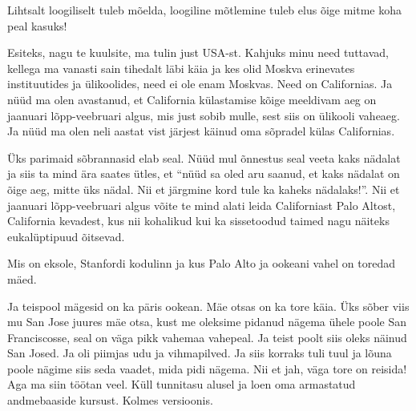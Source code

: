 
Lihtsalt loogiliselt tuleb mõelda, loogiline mõtlemine tuleb elus õige mitme koha peal kasuks! 


Esiteks, nagu te kuulsite, ma tulin just USA-st. Kahjuks minu need tuttavad, kellega ma vanasti sain tihedalt läbi  käia ja kes olid Moskva erinevates instituutides ja ülikoolides, need ei ole enam Moskvas. Need on Californias. Ja nüüd ma olen avastanud, et California külastamise kõige meeldivam aeg on jaanuari lõpp-veebruari algus, mis just sobib mulle, sest siis on ülikooli vaheaeg. Ja nüüd ma olen neli aastat vist järjest käinud oma sõpradel külas Californias. 

Üks parimaid sõbrannasid elab seal. Nüüd mul õnnestus seal veeta kaks nädalat ja siis ta mind ära saates ütles, et \enquote{nüüd sa oled aru saanud, et  kaks nädalat on õige aeg, mitte üks nädal. Nii et järgmine kord tule ka kaheks nädalaks!}. Nii et jaanuari lõpp-veebruari algus võite te mind alati leida Californiast Palo Altost, California kevadest, kus nii kohalikud kui ka sissetoodud taimed nagu näiteks eukalüptipuud õitsevad. 


Mis on eksole, Stanfordi kodulinn ja kus Palo Alto ja ookeani vahel on toredad mäed. 

Ja teispool mägesid on ka päris ookean. Mäe otsas on ka tore käia. Üks sõber viis mu San Jose juures mäe otsa, kust me oleksime pidanud nägema ühele poole San Franciscosse, seal on väga pikk vahemaa vahepeal. Ja teist poolt siis oleks näinud San Josed. Ja oli piimjas udu ja vihmapilved. Ja siis korraks tuli tuul ja lõuna poole nägime siis seda vaadet, mida pidi nägema. Nii et jah, väga tore on reisida! Aga ma siin töötan veel. Küll tunnitasu alusel ja loen oma armastatud andmebaaside kursust. Kolmes versioonis. 